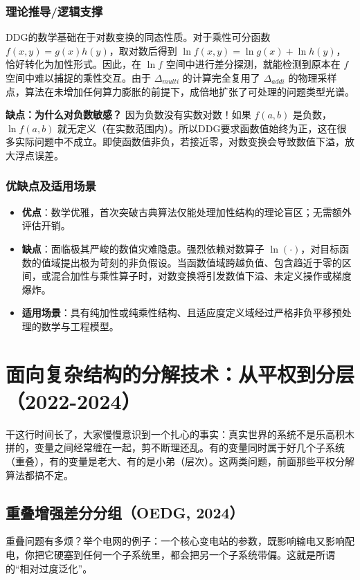 \subsubsection*{理论推导/逻辑支撑}
DDG的数学基础在于对数变换的同态性质。对于乘性可分函数 $f(x,y)=g(x)h(y)$，取对数后得到 $\ln f(x,y)=\ln g(x)+\ln h(y)$，恰好转化为加性形式。因此，在 $\ln f$ 空间中进行差分探测，就能检测到原本在 $f$ 空间中难以捕捉的乘性交互。由于 $\Delta_{multi}$ 的计算完全复用了 $\Delta_{addi}$ 的物理采样点，算法在未增加任何算力膨胀的前提下，成倍地扩张了可处理的问题类型光谱。

\textbf{缺点：为什么对负数敏感？} 因为负数没有实数对数！如果 $f(a,b)$ 是负数，$\ln f(a,b)$ 就无定义（在实数范围内）。所以DDG要求函数值始终为正，这在很多实际问题中不成立。即使函数值非负，若接近零，对数变换会导致数值下溢，放大浮点误差。

\subsubsection*{优缺点及适用场景}
\begin{itemize}
    \item \textbf{优点}：数学优雅，首次突破古典算法仅能处理加性结构的理论盲区；无需额外评估开销。
    \item \textbf{缺点}：面临极其严峻的数值灾难隐患。强烈依赖对数算子 $\ln(\cdot)$，对目标函数的值域提出极为苛刻的非负假设。当函数值域跨越负值、包含趋近于零的区间，或混合加性与乘性算子时，对数变换将引发数值下溢、未定义操作或梯度爆炸。
    \item \textbf{适用场景}：具有纯加性或纯乘性结构、且适应度定义域经过严格非负平移预处理的数学与工程模型。
\end{itemize}

\section{面向复杂结构的分解技术：从平权到分层（2022-2024）}
干这行时间长了，大家慢慢意识到一个扎心的事实：真实世界的系统不是乐高积木拼的，变量之间经常缠在一起，剪不断理还乱。有的变量同时属于好几个子系统（重叠），有的变量是老大、有的是小弟（层次）。这两类问题，前面那些平权分解算法都搞不定。

\subsection{重叠增强差分分组（OEDG, 2024）}
重叠问题有多烦？举个电网的例子：一个核心变电站的参数，既影响输电又影响配电，你把它硬塞到任何一个子系统里，都会把另一个子系统带偏。这就是所谓的“相对过度泛化”。

